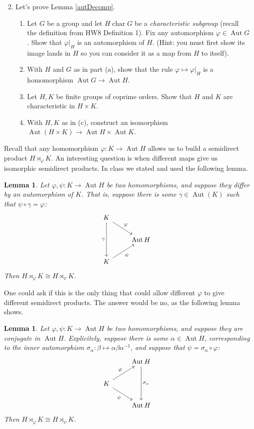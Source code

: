 \documentclass[11pt]{article}
\newtheorem{lemma}[theorem]{Lemma}
\newcommand{\Aut}{\operatorname{Aut}}
\newcommand{\ch}{\operatorname{char}}
\begin{document}
\begin{enumerate}
  \setcounter{enumi}{1}
  \item{
  Let's prove Lemma \ref{autDecomp}.
  \begin{enumerate}
    \item{
    Let $G$ be a group and let $H\ch G$ be a \textit{characteristic subgroup} (recall the definition from HW8 Definition 1).  Fix any automorphism $\varphi\in\Aut G$. Show that $\varphi|_H$ is an automorphism of $H$.  (Hint: you must first show its image lands in $H$ so you can consider it as a map from $H$ to itself).
    }
    \item{
    With $H$ and $G$ as in part (a), show that the rule $\varphi\mapsto\varphi|_H$ is a homomorphism $\Aut G\to\Aut H$.
    }
    \item{
    Let $H,K$ be finite groups of coprime orders.  Show that $H$ and $K$ are characteristic in $H\times K$.
    }
    \item{
    With $H,K$ as in (c), construct an isomorphism $\Aut(H\times K)\to\Aut H\times\Aut K$.
    }
  \end{enumerate}
  }
\end{enumerate}
Recall that any homomorphism $\varphi:K\to\Aut H$ allows us to build a semidirect product $H\rtimes_\varphi K$.  An interesting question is when different maps give us isomorphic semidirect products.  In class we stated and used the following lemma.
\begin{lemma}\label{leftSemidirect}
  Let $\varphi,\psi:K\to\Aut H$ be two homomorphisms, and suppose they differ by an automorphism of $K$.  That is, suppose there is some $\gamma\in\Aut(K)$ such that $\psi\circ\gamma = \varphi$:
  \[
  \begin{tikzcd}
    K\ar[dr,"\varphi"]\ar[dd,swap,"\gamma"] & \\
     & \Aut H\\
    K\ar[ur,swap, "\psi"] &
  \end{tikzcd}
  \]
  Then $H\rtimes_\varphi K\cong H\rtimes_\psi K$.
\end{lemma}
One could ask if this is the only thing that could allow different $\varphi$ to give different semidirect products.  The answer would be no, as the following lemma shows.
\begin{lemma}\label{rightSemidirect}
  Let $\varphi,\psi:K\to\Aut H$ be two homomorphisms, and suppose they are conjugate in $\Aut H$.  Explicitely, suppose there is some $\alpha\in\Aut H$, corresponding to the inner automorphism $\sigma_\alpha:\beta\mapsto \alpha\beta\alpha^{-1}$, and suppose that $\psi = \sigma_\alpha\circ\varphi$:
  \[
  \begin{tikzcd}
    &\Aut H\ar[dd,"\sigma_\alpha"]\\
    K\ar[ur,"\varphi"]\ar[dr,swap,"\psi"]\\
    &\Aut H
  \end{tikzcd}
  \]
  Then $H\rtimes_\varphi K\cong H\rtimes_\psi K$.
\end{lemma}
\end{document}
